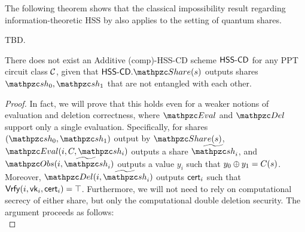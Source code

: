 The following theorem shows that the classical impossibility result
regarding information-theoretic HSS by \cite{ITCS:BGILT18} also
applies to the setting of quantum shares.

\begin{theorem}
TBD.
\end{theorem}

\begin{theorem}
There does not exist an Additive (comp)-HSS-CD scheme $\mathsf{HSS\textrm{-}CD}$ for
any PPT circuit class $\mathcal{C}$, 
given that $\HSScd.\Sh(s)$ outputs shares $\qsh_0, \qsh_1$ that are
not entangled with each other.
\end{theorem}
\begin{proof}
In fact, we will prove that this holds even for a weaker notions of
evaluation and deletion correctness, where $\Ev$ and $\Del$ support
only a single evaluation. Specifically, for shares $(\qsh_0,
\qsh_1)$ output by $\Sh(s)$, $\Ev(i, C, \qsh_i)$ outputs a share
$\nqsh_i$, and $\Obs(i, \nqsh_i)$ outputs a value $y_i$ such that
$y_0 \oplus y_1 = C(s)$. Moreover, $\Del(i, \nqsh_i)$ outputs
$\mathsf{cert}_i$ such that $\mathsf{Vrfy}(i, \mathsf{vk}_i, \mathsf{cert}_i) = \top$. Furthermore,
we will not need to rely on computational secrecy of either share,
but only the computational double deletion security.
The argument proceeds as follows:\\


\end{proof}
